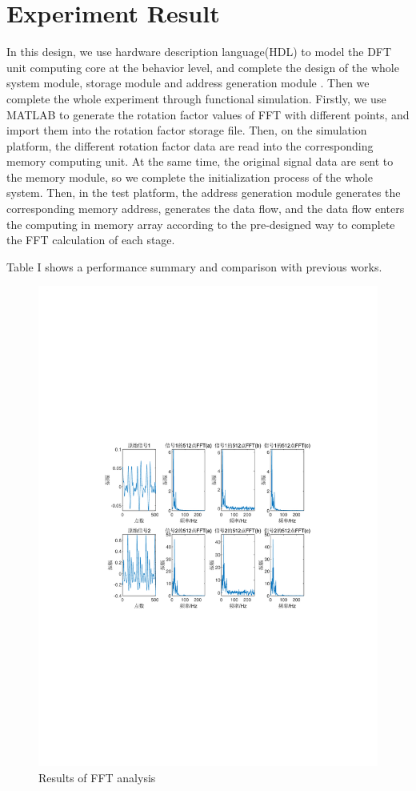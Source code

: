 \documentclass[journal]{IEEEtran}
\begin{document}
\section{Experiment Result}
In this design, we use hardware description language(HDL) to model the DFT unit computing core at the behavior level, and complete the design of the whole system module, storage module and address generation module \cite{3}. Then we complete the whole experiment through functional simulation. Firstly, we use MATLAB to generate the rotation factor values of FFT with different points, and import them into the rotation factor storage file. Then, on the simulation platform, the different rotation factor data are read into the corresponding memory computing unit. At the same time, the original signal data are sent to the memory module, so we complete the initialization process of the whole system. Then, in the test platform, the address generation module generates the corresponding memory address, generates the data flow, and the data flow enters the computing in memory array according to the pre-designed way to complete the FFT calculation of each stage.

Table I shows a performance summary and comparison with previous works.


\begin{figure}[h]
\centering
\includegraphics[scale=0.7]{figures/figure7.pdf}
\caption{Results of FFT analysis}
\end{figure}
\end{document}
